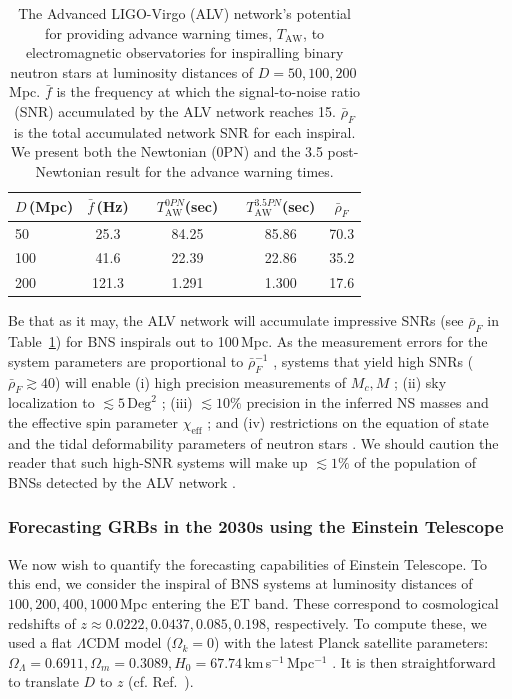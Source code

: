\documentclass[amsmath,amssymb,aps,floats,amsfonts,notitlepage,superscriptaddress,eqsecnum,nofootinbib,10pt]{revtex4-1}
\newcommand\T{\rule{0pt}{2.6ex}}       %
\newcommand\B{\rule[-1.2ex]{0pt}{0pt}} %
\begin{document}
\begin{table}[h]
\centering
\begin{tabular}{lcccccc}
\hline
$D\,$(Mpc) & $\bar{f}\,$(Hz) &{}& $T^{0PN}_\text{AW}$(sec) &\hspace{1mm} & $T^{3.5PN}_\text{AW}$(sec)& $\bar{\rho}_F$\T\B\\
\hline
50 & 25.3 & & 84.25 & & 85.86 & 70.3 \T\\
100 & 41.6 & & 22.39 & & 22.86 & 35.2 \\
200 & 121.3 & & 1.291 &\quad & 1.300 & 17.6 \\
\hline
\end{tabular}
\caption{The Advanced LIGO-Virgo (ALV) network's potential for providing advance warning times, $T_\text{AW}$, 
to electromagnetic observatories for inspiralling binary neutron stars at luminosity distances of $D=50,100,200\,$Mpc. 
$\bar{f}$ is the frequency at which the  signal-to-noise ratio (SNR) accumulated by the ALV network reaches 15. 
$\bar{\rho}_F$ is the total accumulated network SNR for each inspiral. We present both the Newtonian (0PN) 
and the 3.5 post-Newtonian result for the advance warning times.}\label{table:LIGO2020}
\end{table}
%
%
Be that as it may,
the ALV network will accumulate impressive SNRs 
(see $\bar{\rho}_F$ in Table~\ref{table:LIGO2020}) for BNS inspirals out to 100\,Mpc.
As the measurement errors for the system parameters are proportional to $\bar\rho^{-1}_F$ \cite{Cutler:1994ys},
systems that yield high SNRs ($\bar\rho_F\gtrsim 40$) will enable (i) high precision measurements of 
$M_c, M$ \cite{Farr:2015lna}; (ii) sky localization to $\lesssim 5\,\text{Deg}^2$ \cite{Rodriguez:2013oaa};
(iii) $ \lesssim 10\%$ precision in the inferred NS masses \cite{Rodriguez:2013oaa} and the effective spin parameter $\chi_\text{eff}$ \cite{Zhu:2017znf}; and
(iv) restrictions on the equation of state and the tidal deformability
parameters of neutron stars \cite{Read:2009yp, Andersson:2009yt, PhysRevD.89.103012, PhysRevD.91.043002}.
We should caution the reader that such high-SNR systems will make up $\lesssim 1\%$ of the population of BNSs detected by 
the ALV network \cite{Sathyaprakash:2012jk}.

\subsubsection{Forecasting GRBs in the 2030s using the Einstein Telescope}\label{Sec:ETB}
We now wish to quantify the forecasting capabilities of Einstein Telescope. To this end, we consider the inspiral of BNS systems
at luminosity distances of $100,200,400,1000\,$Mpc entering the ET band. 
These correspond to cosmological redshifts of $z\approx 0.0222,0.0437, 0.085, 0.198$, respectively.
To compute these, we used a flat $\Lambda$CDM model ($\Omega_k=0$) with the latest Planck satellite parameters: 
$\Omega_\Lambda = 0.6911, \Omega_m = 0.3089, H_0 = 67.74\,$km\,s$^{-1}\,$Mpc$^{-1}$ \cite{Planck2015}. %
It is then straightforward to translate $D$ to $z$ (cf. Ref.~\cite{Hogg:1999ad}).
\end{document}
